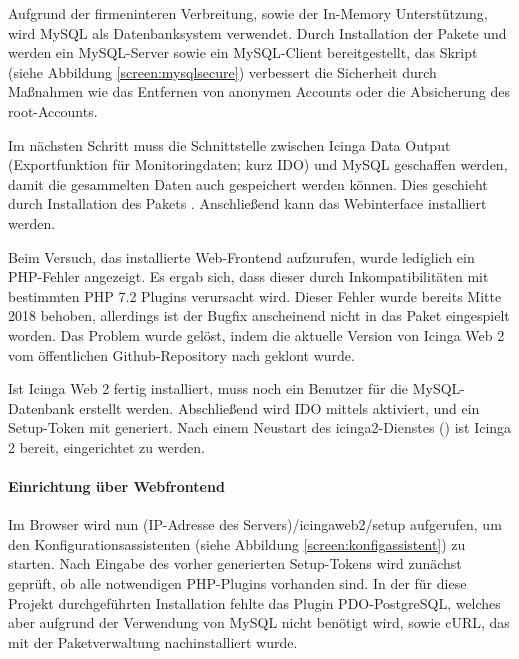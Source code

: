 Aufgrund der firmeninteren Verbreitung, sowie der In-Memory Unterstützung, wird MySQL als Datenbanksystem verwendet. Durch Installation der Pakete  und  werden ein MySQL-Server sowie ein MySQL-Client bereitgestellt, das Skript  (siehe Abbildung \ref{screen:mysqlsecure}) verbessert die Sicherheit durch Maßnahmen wie das Entfernen von anonymen Accounts oder die Absicherung des root-Accounts.

Im nächsten Schritt muss die Schnittstelle zwischen \glqq{}Icinga Data Output\grqq{} (Exportfunktion für Monitoringdaten; kurz IDO) und MySQL geschaffen werden, damit die gesammelten Daten auch gespeichert werden können. Dies geschieht durch Installation des Pakets . Anschließend kann das Webinterface  installiert werden.

Beim Versuch, das installierte Web-Frontend aufzurufen, wurde lediglich ein PHP-Fehler angezeigt. Es ergab sich, dass dieser durch Inkompatibilitäten mit bestimmten PHP 7.2 Plugins verursacht wird. Dieser Fehler wurde bereits Mitte 2018 behoben, allerdings ist der Bugfix anscheinend nicht in das Paket eingespielt worden. Das Problem wurde gelöst, indem die aktuelle Version von \glqq{}Icinga Web 2\grqq{} vom öffentlichen Github-Repository nach  geklont wurde.

Ist \glqq{}Icinga Web 2\grqq{} fertig installiert, muss noch ein Benutzer für die MySQL-Datenbank erstellt werden. Abschließend wird IDO mittels  aktiviert, und ein Setup-Token mit  generiert. Nach einem Neustart des icinga2-Dienstes () ist \glqq{}Icinga 2\grqq{} bereit, eingerichtet zu werden.

\paragraph{Einrichtung über Webfrontend}
Im Browser wird nun (IP-Adresse des Servers)/icingaweb2/setup aufgerufen, um den Konfigurationsassistenten (siehe Abbildung \ref{screen:konfigassistent}) zu starten. Nach Eingabe des vorher generierten Setup-Tokens wird zunächst geprüft, ob alle notwendigen PHP-Plugins vorhanden sind. In der für diese Projekt durchgeführten Installation fehlte das Plugin \glqq{}PDO-PostgreSQL\grqq{}, welches aber aufgrund der Verwendung von MySQL nicht benötigt wird, sowie \glqq{}cURL\grqq{}, das mit der Paketverwaltung nachinstalliert wurde.

